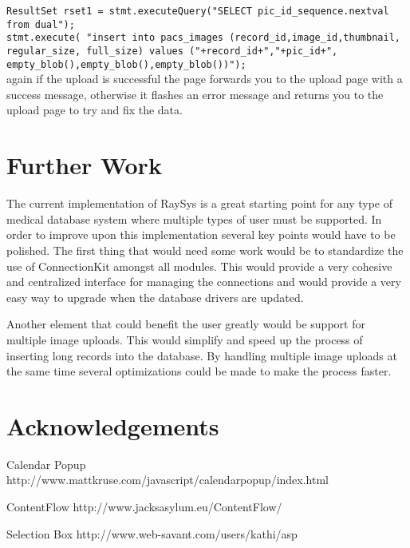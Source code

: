 \documentclass[12pt]{report}
\begin{document}
        \texttt{ResultSet rset1 = stmt.executeQuery("SELECT pic\_id\_sequence.nextval\\from dual");}\\
        
        \texttt{stmt.execute( "insert into pacs\_images (record\_id,image\_id,thumbnail,\\regular\_size, full\_size) values ("+record\_id+","+pic\_id+",\\empty\_blob(),empty\_blob(),empty\_blob())");}\\

again if the upload is successful the page forwards you to the upload page with a success message, otherwise it flashes an error message and returns you to the upload page to try and fix the data.

\section*{Further Work}
The current implementation of RaySys is a great starting point for any type of medical database system where multiple types of user must be supported. In order to improve upon this implementation several key points would have to be polished. The first thing that would need some work would be to standardize the use of ConnectionKit amongst all modules. This would provide a very cohesive and centralized interface for managing the connections and would provide a very easy way to upgrade when the database drivers are updated.

Another element that could benefit the user greatly would be support for multiple image uploads. This would simplify and speed up the process of inserting long records into the database. By handling multiple image uploads at the same time several optimizations could be made to make the process faster.

\section*{Acknowledgements}

Calendar Popup http://www.mattkruse.com/javascript/calendarpopup/index.html

ContentFlow  http://www.jacksasylum.eu/ContentFlow/

Selection Box http://www.web-savant.com/users/kathi/asp
\end{document}
